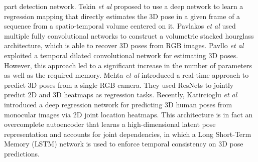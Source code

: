 \documentclass{bmvc2k}
\def\etal{\emph{et al}\bmvaOneDot}
\begin{document}
part detection network. Tekin \etal \cite{tekin2016direct} proposed to use a deep network to learn a regression mapping that directly estimates the 3D pose in a given frame of a sequence from a spatio-temporal volume centered on it. Pavlakos \etal \cite{pavlakos2017coarse} used multiple fully convolutional networks to construct a volumetric stacked hourglass architecture, which is able to recover 3D poses from RGB images. Pavllo \etal \cite{pavllo20183d} exploited a temporal dilated convolutional network \cite{Yu2016MultiScaleCA} for estimating 3D poses. However, this approach led to a significant increase in the number of parameters as well as the required memory. Mehta \etal \cite{VNect_SIGGRAPH2017} introduced a real-time approach to predict 3D poses from a single RGB camera. They used ResNets \cite{7780459} to jointly predict 2D and 3D heatmaps as regression tasks. Recently, Katircioglu \etal \cite{Katircioglu2018} introduced a deep regression network for predicting 3D human poses from monocular images via 2D joint location heatmaps. This architecture is in fact an overcomplete autoencoder that learns a high-dimensional latent pose representation and accounts for joint dependencies, in which a Long Short-Term Memory (LSTM) network \cite{Hochreiter1997LongSM} is used to enforce temporal consistency on 3D pose predictions.
\end{document}
